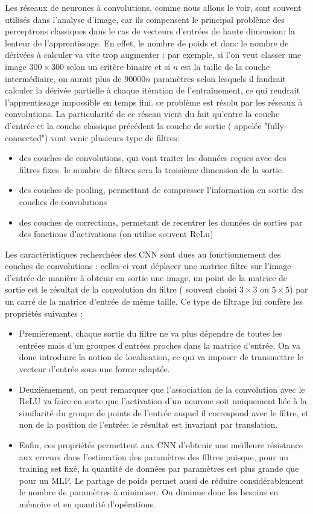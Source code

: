 \documentclass[
    10pt,
    a4paper,
    oneside,
    headinclude,footinclude,
    BCOR=5mm,
    captions=tableabove
]{scrartcl}
\begin{document}
Les réseaux de neurones à convolutions, comme nous allons le voir, sont souvent utilisés dans l'analyse d'image, car ils compensent le principal problème des perceptrons classiques dans le cas de vecteurs d'entrées de haute dimension: la lenteur de l'apprentissage. En effet, le nombre de poids et donc le nombre de dérivées à calculer va vite trop augmenter : par exemple, si l'on veut classer une image $300\times300$ selon un critère binaire et si $n$ est la taille de la couche intermédiaire, on aurait plus de $90000 n$ paramètres selon lesquels il faudrait calculer la dérivée partielle à chaque itération de l'entraînement, ce qui rendrait l'apprentissage impossible en temps fini. 
\vspace{5mm}
ce problème est résolu par les réseaux à convolutions. La particularité de ce réseau vient du fait qu'entre la couche d'entrée et la couche classique précédent la couche de sortie ( appelée "fully-connected") vont venir plusieurs type de filtres:
\begin{itemize}
	\item des couches de convolutions, qui vont traiter les données reçues avec des filtres fixes. le nombre de filtres sera la troisième dimension de la sortie.
	\item des couches de pooling, permettant de compresser l'information en sortie des couches de convolutions
	\item des couches de corrections, permetant de recentrer les données de sorties par des fonctions d'activations (on utilise souvent ReLu)
\end{itemize}

Les caractéristiques recherchées des CNN sont dues au fonctionnement des couches de convolutions : celles-ci vont déplacer une matrice filtre sur l'image d'entrée de manière à obtenir en sortie une image, un point de la matrice de sortie est le résultat de la convolution du filtre ( souvent choisi $3\times3$ ou $5\times5$) par un carré de la matrice d'entrée de même taille.
Ce type de filtrage lui confère les propriétés suivantes :
\begin{itemize}
	\item Premièrement, chaque sortie du filtre ne va plus dépendre de toutes les entrées mais d'un groupes d'entrées proches dans la matrice d'entrée. On va donc introduire la notion de localisation, ce qui va imposer de transmettre le vecteur d'entrée sous une forme adaptée.
	\item Deuxièmement, on peut remarquer que l'association de la convolution avec le ReLU va faire en sorte que l'activation d'un neurone soit uniquement liée à la similarité du groupe de points de l'entrée auquel il correspond avec le filtre, et non de la position de l'entrée: le résultat est invariant par translation.
	\item Enfin, ces propriétés permettent aux CNN d'obtenir une meilleure résistance aux erreurs dans l'estimation des paramètres des filtres puisque, pour un training set fixé, la quantité de données par paramètres est plus grande que pour un MLP. Le partage de poids permet aussi de réduire considérablement le nombre de paramètres à minimiser. On diminue donc les besoins en mémoire et en quantité d'opérations.
\end{itemize}
\end{document}
